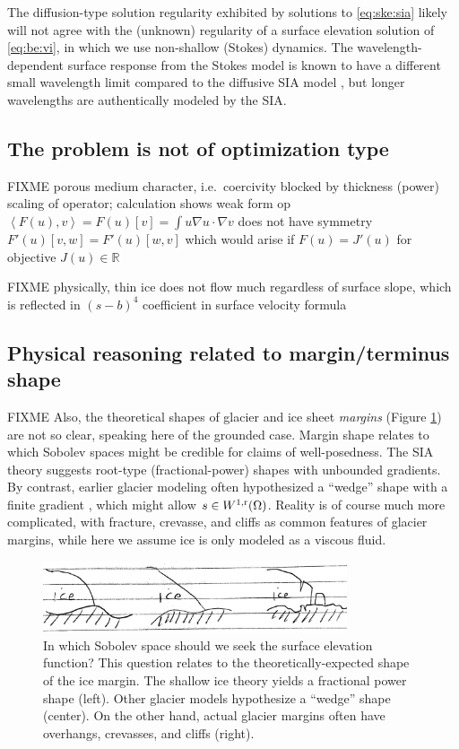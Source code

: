 \documentclass[hidelinks,onefignum,onetabnum,final]{siamart220329}  %
\newcommand{\RR}{\mathbb{R}}
\newcommand{\grad}{\nabla}
\newcommand{\rr}{{\text{\textnormal{r}}}}
\newcommand{\ip}[2]{\left<#1,#2\right>}
\begin{document}
The diffusion-type solution regularity exhibited by solutions to \eqref{eq:ske:sia} likely will not agree with the (unknown) regularity of a surface elevation solution of \eqref{eq:be:vi}, in which we use non-shallow (Stokes) dynamics.  The wavelength-dependent surface response from the Stokes model is known to have a different small wavelength limit compared to the diffusive SIA model \cite[for example]{Pattynetal2008}, but longer wavelengths are authentically modeled by the SIA.

\subsection{The problem is not of optimization type} \label{subsec:notopt}  FIXME porous medium character, i.e.~coercivity blocked by thickness (power) scaling of operator; calculation shows weak form op $\ip{F(u)}{v} = F(u)[v] = \int u \grad u\cdot \grad v$ does not have symmetry $F'(u)[v,w] = F'(u)[w,v]$ which would arise if $F(u)=J'(u)$ for objective $J(u) \in \RR$

FIXME physically, thin ice does not flow much regardless of surface slope, which is reflected in $(s-b)^4$ coefficient in surface velocity formula

\subsection{Physical reasoning related to margin/terminus shape} \label{subsec:margin}  FIXME Also, the theoretical shapes of glacier and ice sheet \emph{margins} (Figure \ref{fig:margins}) are not so clear, speaking here of the grounded case.  Margin shape relates to which Sobolev spaces might be credible for claims of well-posedness.  The SIA theory suggests root-type (fractional-power) shapes \cite{Bueleretal2005} with unbounded gradients.  By contrast, earlier glacier modeling often hypothesized a ``wedge'' shape with a finite gradient \cite[for example]{EchelmeyerKamb1986}, which might allow $s\in W^{1,\rr}(\Omega)$.  Reality is of course much more complicated, with fracture, crevasse, and cliffs as common features of glacier margins, while here we assume ice is only modeled as a viscous fluid.

\begin{figure}
\begin{center}
\includegraphics[width=0.8\textwidth]{figs/margins.jpg}
\end{center}
\caption{In which Sobolev space should we seek the surface elevation function?  This question relates to the theoretically-expected shape of the ice margin.  The shallow ice theory yields a fractional power shape (left).  Other glacier models hypothesize a ``wedge'' shape (center).  On the other hand, actual glacier margins often have overhangs, crevasses, and cliffs (right).} %
\label{fig:margins}
\end{figure}
\end{document}

